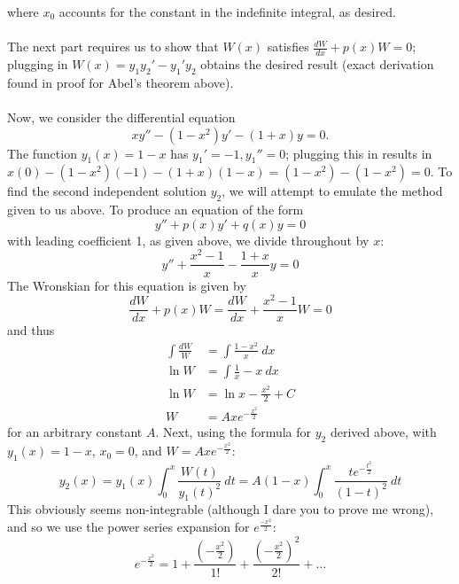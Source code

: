 \documentclass{article}
\begin{document}
where $x_0$ accounts for the constant in the indefinite integral, as desired. \\ \\
The next part requires us to show that $W(x)$ satisfies $\frac{dW}{dx} + p(x)W = 0$; plugging in $W(x) = y_1y_2'-y_1'y_2$ obtains the desired result (exact derivation found in proof for Abel's theorem above). \\ \\
Now, we consider the differential equation 
\begin{equation*}
    xy''-(1-x^2)y'-(1+x)y=0.
\end{equation*}
The function $y_1(x) = 1-x$ has $y_1' = -1, y_1'' = 0$; plugging this in results in $x(0) - (1-x^2)(-1) - (1+x)(1-x) = (1-x^2)-(1-x^2)  = 0$. To find the second independent solution $y_2$, we will attempt to emulate the method given to us above. To produce an equation of the form
\begin{equation*}
    y''+p(x)y'+q(x)y=0
\end{equation*}
with leading coefficient 1, as given above, we divide throughout by $x$:
\begin{equation*}
    y'' + \frac{x^2-1}{x} - \frac{1+x}{x}y = 0
\end{equation*}
The Wronskian for this equation is given by 
\begin{equation*}
    \frac{dW}{dx} + p(x)W = \frac{dW}{dx} + \frac{x^2-1}{x}W = 0 
\end{equation*}
and thus 
\begin{equation*}
    \begin{aligned}
    \int \frac{dW}{W} &= \int \frac{1-x^2}{x}\ dx \\
    \ln W &= \int \frac{1}{x} - x \ dx \\
    \ln W &= \ln x - \frac{x^2}{2} + C \\
    W &= Axe^{-\frac{x^2}{2}}
    \end{aligned}
\end{equation*}
for an arbitrary constant $A$. Next, using the formula for $y_2$ derived above, with $y_1(x) = 1-x$, $x_0=0$, and $W = Axe^{-\frac{x^2}{2}}$:
\begin{equation*}
    y_2(x)=y_1(x)\int^{x}_{0} \frac{W(t)}{y_1(t)^2}\ dt = A(1-x)\int^{x}_{0} \frac{te^{-\frac{t^2}{2}}}{(1-t)^2} \ dt
\end{equation*}
This obviously seems non-integrable (although I dare you to prove me wrong), and so we use the power series expansion for $e^{\frac{-x^2}{2}}$:
\begin{equation*}
    e^{-\frac{x^2}{2}} = 1 + \frac{(-\frac{x^2}{2})}{1!} + \frac{(-\frac{x^2}{2})^2}{2!} + \dots
\end{equation*}
\end{document}

